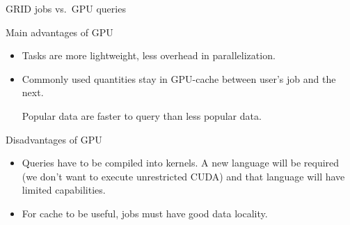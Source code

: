 \documentclass{beamer}
\begin{document}
\begin{frame}{GRID jobs vs.\ GPU queries}
\vspace{0.5 cm}
\begin{block}{Main advantages of GPU}
\begin{itemize}
\item Tasks are more lightweight, less overhead in parallelization.
\item Commonly used quantities stay in GPU-cache between user's job and the next.

\vspace{0.1 cm}
Popular data are faster to query than less popular data.
\end{itemize}
\end{block}

\begin{block}{Disadvantages of GPU}
\begin{itemize}
\item Queries have to be compiled into kernels. A new language will be required (we don't want to execute unrestricted CUDA) and that language will have limited capabilities.
\item For cache to be useful, jobs must have good data locality.
\end{itemize}
\end{block}
\end{frame}
\end{document}

